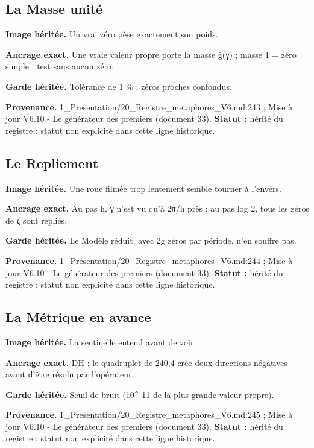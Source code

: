 \documentclass[
  9pt,
  a4paper,
]{article}
\begin{document}
\hypertarget{la-masse-unituxe9}{%
\subsection{La Masse unité}\label{la-masse-unituxe9}}

\textbf{Image héritée.} Un vrai zéro pèse exactement son poids.

\textbf{Ancrage exact.} Une vraie valeur propre porte la masse ĝ(γ) ;
masse 1 = zéro simple ; test sans aucun zéro.

\textbf{Garde héritée.} Tolérance de 1 \% ; zéros proches confondus.

\textbf{Provenance.} 1\_Presentation/20\_Registre\_metaphores\_V6.md:243
; Mise à jour V6.10 - Le générateur des premiers (document 33).
\textbf{Statut :} hérité du registre : statut non explicité dans cette
ligne historique.

\hypertarget{le-repliement}{%
\subsection{Le Repliement}\label{le-repliement}}

\textbf{Image héritée.} Une roue filmée trop lentement semble tourner à
l'envers.

\textbf{Ancrage exact.} Au pas h, γ n'est vu qu'à 2π/h près ; au pas log
2, tous les zéros de ζ sont repliés.

\textbf{Garde héritée.} Le Modèle réduit, avec 2g zéros par période,
n'en souffre pas.

\textbf{Provenance.} 1\_Presentation/20\_Registre\_metaphores\_V6.md:244
; Mise à jour V6.10 - Le générateur des premiers (document 33).
\textbf{Statut :} hérité du registre : statut non explicité dans cette
ligne historique.

\hypertarget{la-muxe9trique-en-avance}{%
\subsection{La Métrique en avance}\label{la-muxe9trique-en-avance}}

\textbf{Image héritée.} La sentinelle entend avant de voir.

\textbf{Ancrage exact.} DH : le quadruplet de 240,4 crée deux directions
négatives avant d'être résolu par l'opérateur.

\textbf{Garde héritée.} Seuil de bruit (10\^{}-11 de la plus grande
valeur propre).

\textbf{Provenance.} 1\_Presentation/20\_Registre\_metaphores\_V6.md:245
; Mise à jour V6.10 - Le générateur des premiers (document 33).
\textbf{Statut :} hérité du registre : statut non explicité dans cette
ligne historique.
\end{document}
